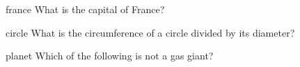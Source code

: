 \begin{defproblem}{france}
What is the capital of France?
\begin{oneparchoices}
\end{oneparchoices}
\end{defproblem}

\begin{defproblem}{circle}
What is the circumference of a circle divided by its diameter?
\begin{choices}
\end{choices}
\end{defproblem}

\begin{defproblem}{planet}
Which of the following is not a gas giant?
\begin{choices}
\end{choices}
\end{defproblem}